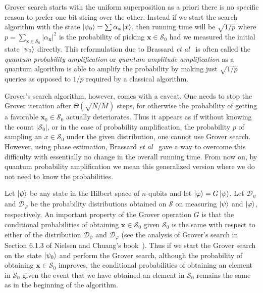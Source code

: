 Grover search starts with the uniform superposition as a priori there is no specific reason to prefer one bit string over the other. Instead if we start the search algorithm with the state $\left\vert \psi_0 \right\rangle = \sum \alpha_{\mathbf{x}} \left\vert x \right\rangle$, then running time will be $\sqrt{1/p}$ where $p = \sum_{\mathbf{x}\in \mathcal{S}_0} |\alpha_{\mathbf{x}}|^2$ is the probability of picking $\mathbf{x}\in \mathcal{S}_0$ had we measured the initial state $\left\vert \psi_0 \right\rangle$ directly. This reformulation due to Brassard \emph{et al}~\cite{brassard98quantum} is often called the \emph{quantum probability amplification} or \emph{quantum amplitude amplification} as a quantum algorithm is able to amplify the probability by making just $\sqrt{1/p}$ queries as opposed to $1/p$ required by a classical algorithm.

Grover's search algorithm, however, comes with a caveat. One needs to stop the Grover iteration after $\Theta(\sqrt{N/M})$ steps, for otherwise the probability of getting a favorable $\mathbf{x}_0 \in \mathcal{S}_0$ actually deteriorates. Thus it appears as if without knowing the count $|\mathcal{S}_0|$, or in the case of probability amplification, the probability $p$ of sampling an $x\in \mathcal{S}_0$ under the given distribution, one cannot use Grover search.  However, using phase estimation, Brassard \emph{et   al}~\cite{brassard98quantum} gave a way to overcome this difficulty with essentially no change in the overall running time. {From} now on, by quantum probability amplification we mean this generalized version where we do not need to know the probabilities.

Let $\left\vert \psi \right\rangle$ be any state in the Hilbert space of $n$-qubits and let $\left\vert \varphi \right\rangle = G\left\vert \psi \right\rangle$. Let $\mathcal{D}_\psi$ and $\mathcal{D}_\varphi$ be the probability distributions obtained on $\mathcal{S}$ on measuring $\left\vert \psi \right\rangle$ and $\left\vert \varphi \right\rangle$, respectively. An important property of the Grover operation $G$ is that the conditional probabilities of obtaining $\mathbf{x}\in \mathcal{S}_0$ given $\mathcal{S}_0$ is the same with respect to either of the distribution $\mathcal{D}_\psi$ and $\mathcal{D}_\varphi$ (see the analysis of Grover's search in Section 6.1.3 of Nielsen and Chuang's book~\cite{nielsenchuang:book}). Thus if we start the Grover search on the state $\left\vert \psi_0 \right\rangle$ and perform the Grover search, although the probability of obtaining $\mathbf{x} \in \mathcal{S}_0$ improves, the conditional probabilities of obtaining an element in $\mathcal{S}_0$ given the event that we have obtained an element in $\mathcal{S}_0$ remains the same as in the beginning of the algorithm. 

